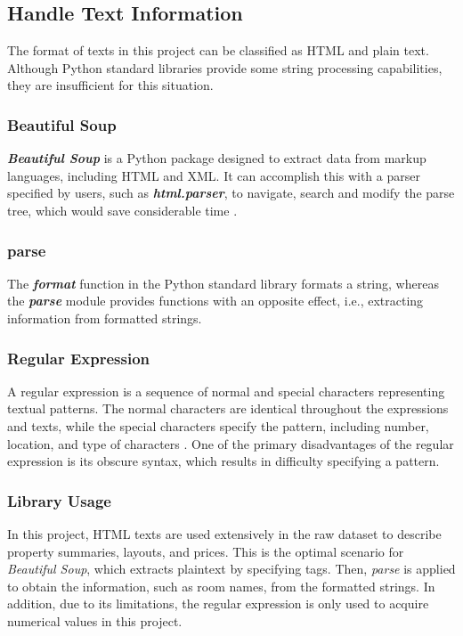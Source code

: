 \documentclass[12pt,twoside]{report}
\begin{document}
\subsection{Handle Text Information}
The format of texts in this project can be classified as HTML and plain text. Although Python standard libraries provide some string processing capabilities, they are insufficient for this situation. 

\subsubsection{Beautiful Soup}
\textit{\textbf{Beautiful Soup}} is a Python package designed to extract data from markup languages, including HTML and XML. It can accomplish this with a parser specified by users, such as \textbf{\textit{html.parser}}, to navigate, search and modify the parse tree, which would save considerable time \citep{RN10}. 

\subsubsection{parse}
The \textit{\textbf{format}} function in the Python standard library formats a string, whereas the \textit{\textbf{parse}} module provides functions with an opposite effect, i.e., extracting information from formatted strings.

\subsubsection{Regular Expression}
A regular expression is a sequence of normal and special characters representing textual patterns. The normal characters are identical throughout the expressions and texts, while the special characters specify the pattern, including number, location, and type of characters  \citep{RN14}. One of the primary disadvantages of the regular expression is its obscure syntax, which results in difficulty specifying a pattern. 

\subsubsection{Library Usage}
In this project, HTML texts are used extensively in the raw dataset to describe property summaries, layouts, and prices. This is the optimal scenario for \textit{Beautiful Soup}, which extracts plaintext by specifying tags. Then, \textit{parse} is applied to obtain the information, such as room names, from the formatted strings. In addition, due to its limitations, the regular expression is only used to acquire numerical values in this project. 
\end{document}
